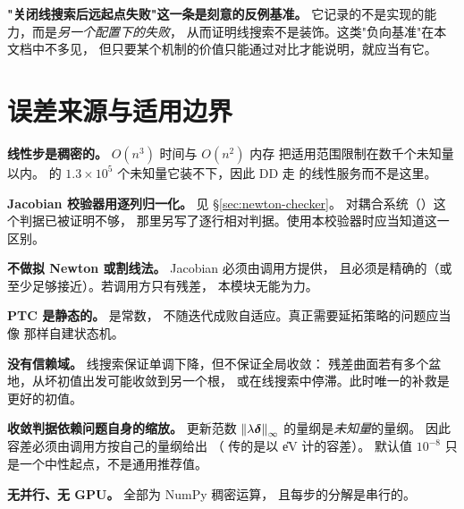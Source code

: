 \noindent
\textbf{"关闭线搜索后远起点失败"这一条是刻意的反例基准。}
它记录的不是实现的能力，而是\emph{另一个配置下的失败}，
从而证明线搜索不是装饰。这类"负向基准"在本文档中不多见，
但只要某个机制的价值只能通过对比才能说明，就应当有它。

\section{误差来源与适用边界}
\label{sec:newton-limits}

\limitsheading

\begin{bounds}
  \item \textbf{线性步是稠密的。} $O(n^{3})$ 时间与 $O(n^{2})$ 内存
        把适用范围限制在数千个未知量以内。
        的 $1.3\times10^{5}$ 个未知量它装不下，因此 DD 走
         的线性服务而不是这里。

  \item \textbf{Jacobian 校验器用逐列归一化。} 见 \S\ref{sec:newton-checker}。
        对耦合系统（）这个判据已被证明不够，
        那里另写了逐行相对判据。使用本校验器时应当知道这一区别。

  \item \textbf{不做拟 Newton 或割线法。} Jacobian 必须由调用方提供，
        且必须是精确的（或至少足够接近）。若调用方只有残差，
        本模块无能为力。

  \item \textbf{PTC 是静态的。}  是常数，
        不随迭代成败自适应。真正需要延拓策略的问题应当像
         那样自建状态机。

  \item \textbf{没有信赖域。} 线搜索保证单调下降，但不保证全局收敛：
        残差曲面若有多个盆地，从坏初值出发可能收敛到另一个根，
        或在线搜索中停滞。此时唯一的补救是更好的初值。

  \item \textbf{收敛判据依赖问题自身的缩放。} 更新范数
        $\left\lVert \lambda\bm{\delta} \right\rVert_\infty$ 的量纲是\emph{未知量}的量纲。
        因此容差必须由调用方按自己的量纲给出
        （ 传的是以 \U{eV} 计的容差）。
        默认值 $10^{-8}$ 只是一个中性起点，不是通用推荐值。

  \item \textbf{无并行、无 GPU。} 全部为 NumPy 稠密运算，
        且每步的分解是串行的。
\end{bounds}

